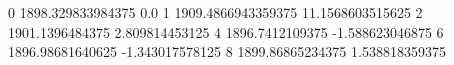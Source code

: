 0 1898.329833984375 0.0
1 1909.4866943359375 11.1568603515625
2 1901.1396484375 2.809814453125
4 1896.7412109375 -1.588623046875
6 1896.98681640625 -1.343017578125
8 1899.86865234375 1.538818359375
